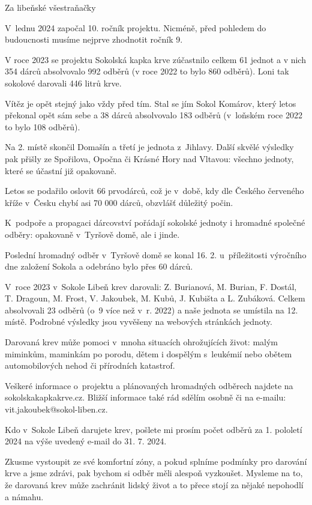 \documentclass[11pt]{article}
\begin{document}
Za libeňské všestraňačky

\signature{Dubina}{}

\vspace*{24pt}

V~lednu 2024 započal 10. ročník projektu. Nicméně, před pohledem do budoucnosti musíme nejprve zhodnotit ročník 9.

V roce 2023 se projektu Sokolská kapka krve zúčastnilo celkem 61 jednot a v nich 354 dárců absolvovalo 992 odběrů (v roce 2022 to bylo 860 odběrů). Loni tak sokolové darovali 446 litrů krve.

Vítěz je opět stejný jako vždy před tím. Stal se jím Sokol Komárov, který letos překonal opět sám sebe a 38 dárců absolvovalo 183 odběrů (v~loňském roce 2022 to bylo 108 odběrů).

Na 2. místě skončil Domašín a třetí je jednota z~Jihlavy. Další skvělé výsledky pak přišly ze Spořilova, Opočna či Krásné Hory nad Vltavou: všechno jednoty, které se účastní již opakovaně.

Letos se podařilo oslovit 66 prvodárců, což je v~době, kdy dle Českého červeného kříže v~Česku chybí asi 70 000 dárců, obzvlášť důležitý počin. 

K~podpoře a propagaci dárcovství pořádají sokolské jednoty i hromadné společné odběry: opakovaně v~Tyršově domě, ale i jinde.

Poslední hromadný odběr v~Tyršově domě se konal 16. 2. u~příležitosti výročního dne založení Sokola a odebráno bylo přes 60 dárců. 

V~roce 2023 v~Sokole Libeň krev darovali: Z. Burianová, M. Burian, F. Dostál, T. Dragoun, M. Frost, V. Jakoubek, M. Kubů, J. Kubišta a L. Zubáková. Celkem absolvovali 23 odběrů (o~9 více než v~r. 2022) a naše jednota se umístila na 12. místě. Podrobné výsledky jsou vyvěšeny na webových stránkách jednoty. 

Darovaná krev může pomoci v~mnoha situacích ohrožujících život: malým miminkům, maminkám po porodu, dětem i dospělým s~leukémií nebo obětem automobilových nehod či přírodních katastrof.

Veškeré informace o~projektu a plánovaných hromadných odběrech najdete na sokolskakapkakrve.cz.
Bližší informace také rád sdělím osobně či na e-mailu: vit.jakoubek@sokol-liben.cz.

Kdo v~Sokole Libeň darujete krev, pošlete mi prosím počet odběrů za 1. pololetí 2024 na výše uvedený e-mail do 31. 7. 2024.

Zkusme vystoupit ze své komfortní zóny, a pokud splníme podmínky pro darování krve a jsme zdrávi, pak bychom si odběr měli alespoň vyzkoušet. Mysleme na to, že darovaná krev může zachránit lidský život a to přece stojí za nějaké nepohodlí a námahu. 
\end{document}
